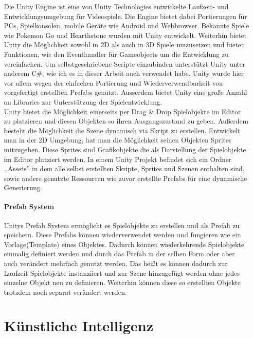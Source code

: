 Die Unity Engine ist eine von Unity Technologies entwickelte Laufzeit- und Entwicklungsumgebung für Videospiele. Die Engine bietet dabei Portierungen für PCs, Spielkonsolen, mobile Geräte wie Android und Webbrowser. Bekannte Spiele wie Pokemon Go und Hearthstone wurden mit Unity entwickelt. Weiterhin bietet Unity die Möglichkeit sowohl in 2D als auch in 3D Spiele umzusetzen und bietet Funktionen, wie den Eventhandler für Gameobjects um die Entwicklung zu vereinfachen. Um selbstgeschriebene Scripte einzubinden unterstützt Unity unter anderem C\#, wie ich es in dieser Arbeit auch verwendet habe. Unity wurde hier vor allem wegen der einfachen Portierung und Wiederverwendbarkeit von vorgefertigt erstellten Prefabs genutzt. Ausserdem bietet Unity eine große Anzahl an Libraries zur Unterstützung der Spielentwicklung. \\Unity bietet die Möglichkeit einerseits per Drag \& Drop Spielobjekte im Editor zu platzieren und diesen Objekten so ihren Ausgangszustand zu geben. Außerdem besteht die Möglichkeit die Szene dynamisch via Skript zu erstellen. Entwickelt man in der 2D Umgebung, hat man die Möglichkeit seinen Objekten Sprites mitzugeben. Diese Sprites sind Grafikobjekte die als Darstellung der Spielobjekte im Editor platziert werden. In einem Unity Projekt befindet sich ein Ordner ,,Assets'' in dem alle selbst erstellten Skripte, Sprites und Szenen enthalten sind, sowie andere genutzte Ressourcen wie zuvor erstellte Prefabs für eine dynamische Generierung.

\paragraph{Prefab System}
\nocite{UPrefabs}
Unitys Prefab System ermöglicht es Spielobjekte zu erstellen und als Prefab zu speichern. Diese Prefabs können wiederverwendet werden und fungieren wie ein Vorlage(Template) eines Objektes. Dadurch können wiederkehrende Spielobjekte einmalig definiert werden und durch das Prefab in der selben Form oder aber auch verändert mehrfach genutzt werden. Das heißt es können dadurch zur Laufzeit Spielobjekte instanziiert und zur Szene hinzugefügt werden ohne jedes einzelne Objekt neu zu definieren. Weiterhin können diese so erstellten Objekte trotzdem noch separat verändert werden.

\section{Künstliche Intelligenz}
\label{ch:Grundlagen:sec:Künstliche Intelligenz}



